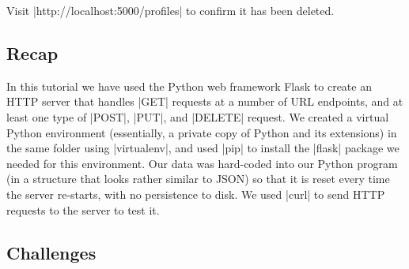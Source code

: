 \documentclass[11pt]{book}
\begin{document}
Visit |http://localhost:5000/profiles| to confirm it has been deleted.

\subsection*{Recap}

In this tutorial we have used the Python web framework Flask to create an HTTP server that handles |GET| requests at a number of URL endpoints, and at least one type of |POST|, |PUT|, and |DELETE| request.  We created a virtual Python environment (essentially, a private copy of Python and its extensions) in the same folder using |virtualenv|, and used |pip| to install the |flask| package we needed for this environment.  Our data was hard-coded into our Python program (in a structure that looks rather similar to JSON) so that it is reset every time the server re-starts, with no persistence to disk.  We used |curl| to send HTTP requests to the server to test it.


\subsection*{Challenges}
\end{document}

